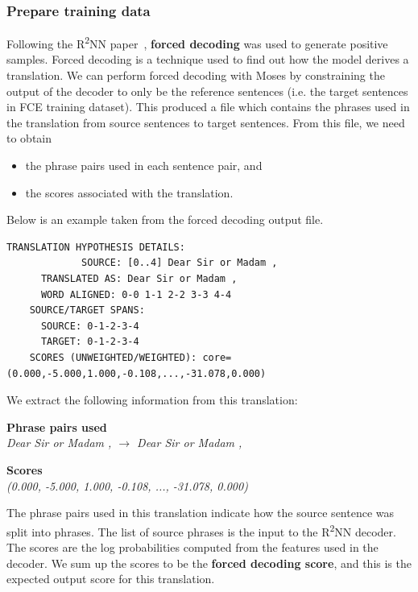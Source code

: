\documentclass[12pt,a4paper,twoside]{report}
\begin{document}
\subsubsection{Prepare training data}
Following the R\textsuperscript{2}NN paper~\cite{r2nn}, \textbf{forced decoding} was used to generate positive samples. Forced decoding is a technique used to find out how the model derives a translation. We can perform forced decoding with Moses by constraining the output of the decoder to only be the reference sentences (i.e. the target sentences in FCE training dataset). This produced a file which contains the phrases used in the translation from source sentences to target sentences. From this file, we need to obtain
\begin{itemize}
  \item the phrase pairs used in each sentence pair, and
  \item the scores associated with the translation.
\end{itemize}

Below is an example taken from the forced decoding output file.
\begin{lstlisting}[breaklines]
    TRANSLATION HYPOTHESIS DETAILS:
             SOURCE: [0..4] Dear Sir or Madam ,
      TRANSLATED AS: Dear Sir or Madam ,
      WORD ALIGNED: 0-0 1-1 2-2 3-3 4-4
    SOURCE/TARGET SPANS:
      SOURCE: 0-1-2-3-4
      TARGET: 0-1-2-3-4
    SCORES (UNWEIGHTED/WEIGHTED): core=(0.000,-5.000,1.000,-0.108,...,-31.078,0.000)
\end{lstlisting}

We extract the following information from this translation:

\hfill\begin{minipage}{\dimexpr\textwidth-0.8cm}
    \vspace*{1mm}
    \textbf{Phrase pairs used}\\
    \textit{Dear Sir or Madam , $\rightarrow$ Dear Sir or Madam ,}

    \vspace*{1mm}

    \textbf{Scores}\\
    \textit{(0.000, -5.000, 1.000, -0.108, ..., -31.078, 0.000)}
    \vspace*{1mm}
\end{minipage}

The phrase pairs used in this translation indicate how the source sentence was split into phrases. The list of source phrases is the input to the R\textsuperscript{2}NN decoder. The scores are the log probabilities computed from the features used in the decoder. We sum up the scores to be the \textbf{forced decoding score}, and this is the expected output score for this translation.
\end{document}
